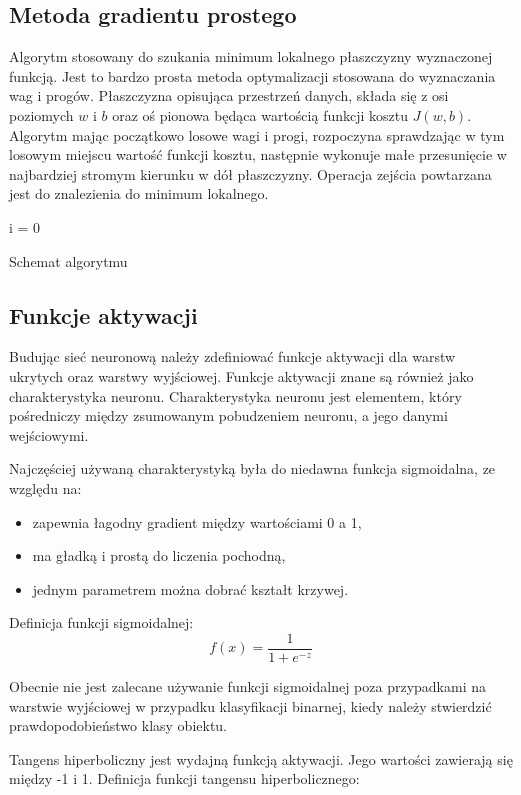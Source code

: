 \documentclass[12pt,a4paper,twoside,titlepage,openright]{book}
\newenvironment{algorytm}[1][htb]
  {\renewcommand{\algorithmcfname}{Algorytm}%
   \begin{algorithm}[#1]%
  }{\end{algorithm}}
\begin{document}
\subsection{Metoda gradientu prostego}
Algorytm stosowany do szukania minimum lokalnego płaszczyzny wyznaczonej funkcją. Jest to bardzo prosta metoda optymalizacji stosowana do wyznaczania wag i progów. Płaszczyzna opisująca przestrzeń danych, składa się z osi poziomych \(w\) i \(b\) oraz oś pionowa będąca wartością funkcji kosztu \(J(w,b)\). Algorytm mając początkowo losowe wagi i progi, rozpoczyna sprawdzając w tym losowym miejscu wartość funkcji kosztu, następnie wykonuje małe przesunięcie w najbardziej stromym kierunku w dół płaszczyzny. Operacja zejścia powtarzana jest do znalezienia do minimum lokalnego.

\begin{algorytm}
i = 0\;
\caption{Schemat algorytmu}
\end{algorytm}

\subsection{Funkcje aktywacji}
Budując sieć neuronową należy zdefiniować funkcje aktywacji dla warstw ukrytych oraz warstwy wyjściowej. Funkcje aktywacji znane są również jako charakterystyka neuronu. Charakterystyka neuronu jest elementem, który pośredniczy między zsumowanym pobudzeniem neuronu, a jego danymi wejściowymi. 

Najczęściej używaną charakterystyką była do niedawna funkcja sigmoidalna, ze względu na:
\begin{itemize}
\item zapewnia łagodny gradient między wartościami 0 a 1,
\item ma gładką i prostą do liczenia pochodną,
\item jednym parametrem można dobrać kształt krzywej.
\end{itemize}

Definicja funkcji sigmoidalnej: $$f(x) = \frac{1}{1+e^{-z}}$$


Obecnie nie jest zalecane używanie funkcji sigmoidalnej poza przypadkami na warstwie wyjściowej w przypadku klasyfikacji binarnej, kiedy należy stwierdzić prawdopodobieństwo klasy obiektu.

Tangens hiperboliczny jest wydajną funkcją aktywacji. Jego wartości zawierają się między -1 i 1. Definicja funkcji tangensu hiperbolicznego:
\end{document}
